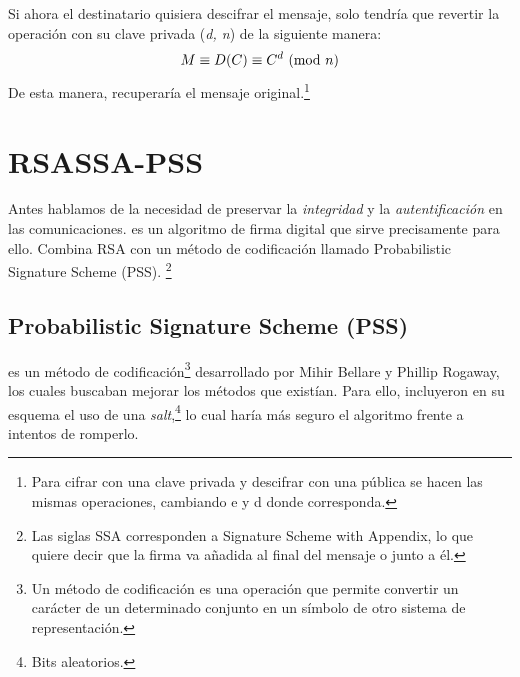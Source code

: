 Si ahora el destinatario quisiera descifrar el mensaje, solo tendría que revertir la operación con su clave privada (\emph{d, n}) de la siguiente manera:
\[ M \equiv D(C) \equiv C^d \ (\mathrm{mod}\ n) \]
De esta manera, recuperaría el mensaje original.\footnote{Para cifrar con una clave privada y descifrar con una pública se hacen las mismas operaciones, cambiando e y d donde corresponda.} \emph{\parencite{Reference12}}


\section{RSASSA-PSS}

Antes hablamos de la necesidad de preservar la \emph{integridad} y la \emph{autentificación} en las comunicaciones.
 es un algoritmo de firma digital que sirve precisamente para ello.
Combina RSA con un método de codificación llamado Probabilistic Signature Scheme (PSS).
\footnote{Las siglas SSA corresponden a Signature Scheme with Appendix, lo que quiere decir que la firma va añadida al final del mensaje o junto a él.}

\subsection{Probabilistic Signature Scheme (PSS)}

 es un método de codificación\footnote{Un método de codificación es una operación que permite convertir un carácter de un determinado conjunto en un símbolo de otro sistema de representación.}
desarrollado por Mihir Bellare y Phillip Rogaway, los cuales buscaban mejorar los métodos que existían.
Para ello, incluyeron en su esquema el uso de una \emph{salt},\footnote{Bits aleatorios.} lo cual haría más seguro el algoritmo frente a intentos de romperlo. \emph{\parencite{Reference15}}

